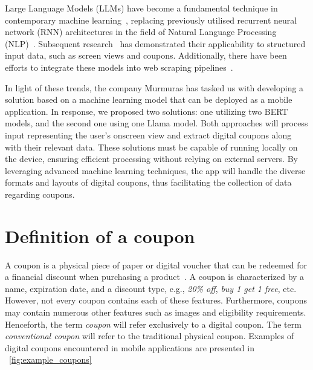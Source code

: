 \documentclass[licencjacka,en]{pracamgr}
\begin{document}
Large Language Models (LLMs) have become a fundamental technique in contemporary machine learning~\cite{LLM-popularity}, replacing previously utilised recurrent neural network (RNN) architectures in the field of Natural Language Processing (NLP)~\cite{li2024}. Subsequent research~\cite{sui2024} has demonstrated their applicability to structured input data, such as screen views and coupons. Additionally, there have been efforts to integrate these models into web scraping pipelines~\cite{scapegraph_repo}.

In light of these trends, the company Murmuras has tasked us with developing a solution based on a machine learning model that can be deployed as a mobile application. In response, we proposed two solutions: one utilizing two BERT~\cite{BERT_intro} models, and the second one using one Llama model. Both approaches will process input representing the user's onscreen view and extract digital coupons along with their relevant data. These solutions must be capable of running locally on the device, ensuring efficient processing without relying on external servers. By leveraging advanced machine learning techniques, the app will handle the diverse formats and layouts of digital coupons, thus facilitating the collection of data regarding coupons.

\section{Definition of a coupon}
A coupon is a physical piece of paper or digital voucher that can be redeemed for a financial discount when purchasing a product~\cite{coupon_definition}. A coupon is characterized by a name, expiration date, and a discount type, e.g., \emph{20\% off}, \emph{buy 1 get 1 free}, etc. However, not every coupon contains each of these features. Furthermore, coupons may contain numerous other features such as images and eligibility requirements. Henceforth, the term \emph{coupon} will refer exclusively to a digital coupon. The term \emph{conventional coupon} will refer to the traditional physical coupon. Examples of digital coupons encountered in mobile applications are presented in ~\ref{fig:example_coupons}
\end{document}
